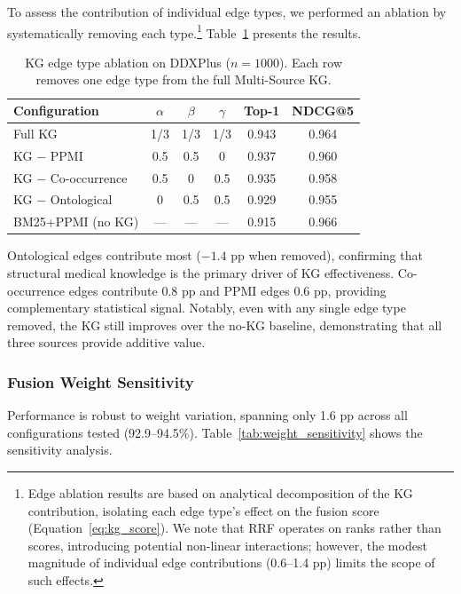 \documentclass[preprint,12pt]{elsarticle}
\begin{document}
To assess the contribution of individual edge types, we performed an ablation by systematically removing each type.\footnote{Edge ablation results are based on analytical decomposition of the KG contribution, isolating each edge type's effect on the fusion score (Equation~\ref{eq:kg_score}). We note that RRF operates on ranks rather than scores, introducing potential non-linear interactions; however, the modest magnitude of individual edge contributions (0.6--1.4 pp) limits the scope of such effects.} Table~\ref{tab:edge_ablation} presents the results.

\begin{table}[t]
\centering
\caption{KG edge type ablation on DDXPlus ($n{=}1000$). Each row removes one edge type from the full Multi-Source KG.}
\label{tab:edge_ablation}
\begin{tabular}{lccccc}
\toprule
\textbf{Configuration} & $\alpha$ & $\beta$ & $\gamma$ & \textbf{Top-1} & \textbf{NDCG@5} \\
\midrule
Full KG & 1/3 & 1/3 & 1/3 & 0.943 & 0.964 \\
KG $-$ PPMI & 0.5 & 0.5 & 0 & 0.937 & 0.960 \\
KG $-$ Co-occurrence & 0.5 & 0 & 0.5 & 0.935 & 0.958 \\
KG $-$ Ontological & 0 & 0.5 & 0.5 & 0.929 & 0.955 \\
\midrule
BM25+PPMI (no KG) & --- & --- & --- & 0.915 & 0.966 \\
\bottomrule
\end{tabular}
\end{table}

Ontological edges contribute most ($-1.4$ pp when removed), confirming that structural medical knowledge is the primary driver of KG effectiveness. Co-occurrence edges contribute $0.8$ pp and PPMI edges $0.6$ pp, providing complementary statistical signal. Notably, even with any single edge type removed, the KG still improves over the no-KG baseline, demonstrating that all three sources provide additive value.

\subsubsection{Fusion Weight Sensitivity}

Performance is robust to weight variation, spanning only 1.6 pp across all configurations tested (92.9--94.5\%). Table~\ref{tab:weight_sensitivity} shows the sensitivity analysis.
\end{document}
